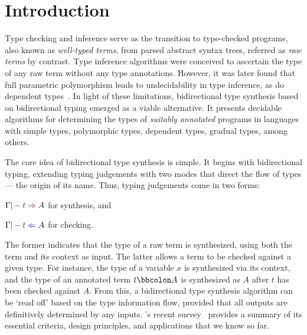 
\section{Introduction}\label{sec:intro}

Type checking and inference serve as the transition to type-checked programs, also known as \emph{well-typed terms}, from parsed abstract syntax trees, referred as \emph{raw terms} by contrast.
Type inference algorithms were conceived to ascertain the type of any raw term without any type annotations.
However, it was later found that full parametric polymorphism leads to undecidability in type inference, as do dependent types~\citep{Wells1999,Dowek1993}.
In light of these limitations, bidirectional type synthesis based on bidirectional typing emerged as a viable alternative.
It presents decidable algorithms for determining the types of \emph{suitably annotated} programs in languages with simple types, polymorphic types, dependent types, gradual types, among others.

The core idea of bidirectional type synthesis is simple.
It begins with bidirectional typing, extending typing judgements with two modes that direct the flow of types --- the origin of its name.
Thus, typing judgements come in two forms:
\begin{enumerate*}
  \item $\Gamma |- \isTerm{t} \syn A$ for synthesis, and 
  \item $\Gamma |- \isTerm{t} \chk A$ for checking.
\end{enumerate*}
The former indicates that the type of a raw term is synthesized, using both the term and its context as input.
The latter allows a term to be checked against a given type.
For instance, the type of a variable $x$ is synthesized via its context, and the type of an annotated term $t \annotate A$ is synthesized as $A$ after $t$ has been checked against $A$.
From this, a bidirectional type synthesis algorithm can be `read off' based on the type information flow, provided that all outputs are definitively determined by any inputs.
\citeauthor{Dunfield2021}'s recent survey~\citeyearpar{Dunfield2021} provides a summary of its essential criteria, design principles, and applications that we know so far.



